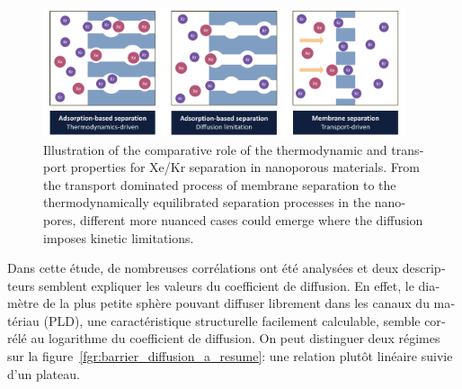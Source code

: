 \documentclass[thesis]{subfiles}
\begin{document}
\begin{otherlanguage}{french}
\begin{figure}[ht]
    \centering
      \includegraphics[width=0.95\textwidth]{figures/5-diffusion/Diffusion.pdf}
      \caption{Illustration of the comparative role of the thermodynamic and transport properties for Xe/Kr separation in nanoporous materials. From the transport dominated process of membrane separation to the thermodynamically equilibrated separation processes in the nanopores, different more nuanced cases could emerge where the diffusion imposes kinetic limitations.}\label{fgr:intro_diffusion_resume}
  \end{figure}

Dans cette étude, de nombreuses corrélations ont été analysées et deux descripteurs semblent expliquer les valeurs du coefficient de diffusion. En effet, le diamètre de la plus petite sphère pouvant diffuser librement dans les canaux du matériau (PLD), une caractéristique structurelle facilement calculable, semble corrélé au logarithme du coefficient de diffusion. On peut distinguer deux régimes sur la figure~\ref{fgr:barrier_diffusion_a_resume}: une relation plutôt linéaire suivie d'un plateau. 


\end{otherlanguage}
\end{document}
